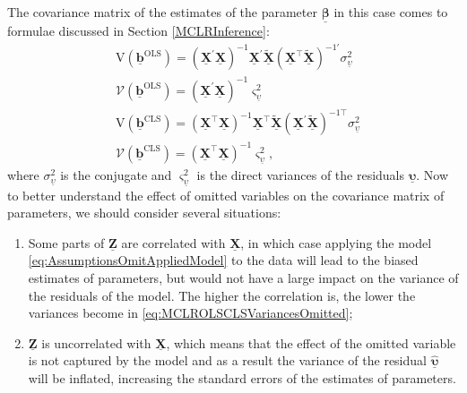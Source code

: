 \documentclass[
]{book}
\providecommand{\tightlist}{%
  \setlength{\itemsep}{0pt}\setlength{\parskip}{0pt}}
\begin{document}
The covariance matrix of the estimates of the parameter \(\underline{\boldsymbol{\beta}}\) in this case comes to formulae discussed in Section \ref{MCLRInference}:
\begin{equation}
    \begin{aligned}
        & \mathrm{V}\left( \underline{\boldsymbol{b}}^{\text{OLS}} \right) = \left( \underline{\mathbf{X}}^\prime \underline{\mathbf{X}} \right)^{-1} \underline{\mathbf{X}}^\prime \tilde{\underline{\mathbf{X}}} \left( {\underline{\mathbf{X}}}^\top \tilde{\underline{\mathbf{X}}} \right)^{-1 \prime}  \sigma_{\underline{\upsilon}}^2 \\
        & \mathcal{V}\left( \underline{\boldsymbol{b}}^{\text{OLS}} \right) = \left( \underline{\mathbf{X}}^\prime \underline{\mathbf{X}} \right)^{-1} \varsigma_{\underline{\upsilon}}^2 \\
        & \mathrm{V}\left( \underline{\boldsymbol{b}}^{\text{CLS}} \right) = \left( \underline{\mathbf{X}}^\top \underline{\mathbf{X}} \right)^{-1} \underline{\mathbf{X}}^\top \tilde{\underline{\mathbf{X}}} \left( {\underline{\mathbf{X}}}^\prime \tilde{\underline{\mathbf{X}}} \right)^{-1 \top}  \sigma_{\underline{\upsilon}}^2 \\
        & \mathcal{V}\left( \underline{\boldsymbol{b}}^{\text{CLS}} \right) = \left( \underline{\mathbf{X}}^\top \underline{\mathbf{X}} \right)^{-1} \varsigma_{\underline{\upsilon}}^2 ,
    \end{aligned}
    \label{eq:MCLROLSCLSVariancesOmitted}
\end{equation}
where \(\sigma_{\underline{\upsilon}}^2\) is the conjugate and \(\varsigma_{\underline{\upsilon}}^2\) is the direct variances of the residuals \(\underline{\boldsymbol{\upsilon}}\). Now to better understand the effect of omitted variables on the covariance matrix of parameters, we should consider several situations:

\begin{enumerate}
\def\labelenumi{\arabic{enumi}.}
\tightlist
\item
  Some parts of \(\underline{\mathbf{Z}}\) are correlated with \(\underline{\mathbf{X}}\), in which case applying the model \eqref{eq:AssumptionsOmitAppliedModel} to the data will lead to the biased estimates of parameters, but would not have a large impact on the variance of the residuals of the model. The higher the correlation is, the lower the variances become in \eqref{eq:MCLROLSCLSVariancesOmitted};
\item
  \(\underline{\mathbf{Z}}\) is uncorrelated with \(\underline{\mathbf{X}}\), which means that the effect of the omitted variable is not captured by the model and as a result the variance of the residual \(\hat{\underline{\boldsymbol{\upsilon}}}\) will be inflated, increasing the standard errors of the estimates of parameters.
\end{enumerate}
\end{document}
